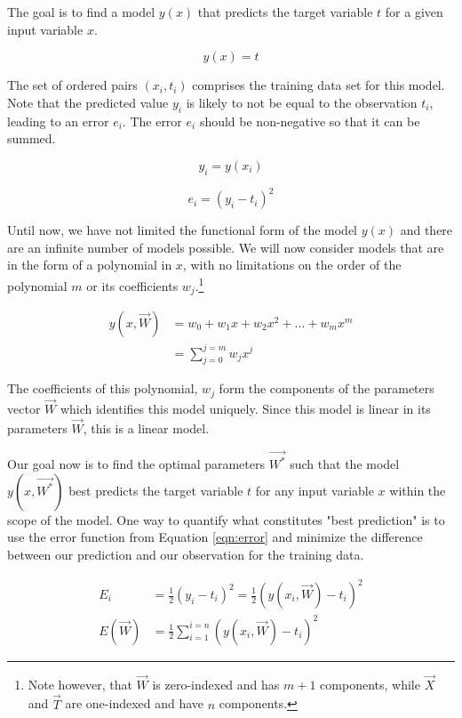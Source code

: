 \documentclass{article}
\begin{document}
The goal is to find a model \(y(x)\) that predicts the target variable \(t\) for a given input variable \(x\).

\begin{equation}
    y(x) = t
\end{equation}

The set of ordered pairs \((x_i, t_i)\) comprises the training data set for this model.
Note that the predicted value \(y_i\) is likely to not be equal to the observation \(t_i\), leading to an error \(e_i\).
The error \(e_i\) should be non-negative so that it can be summed.

\begin{equation}
    y_i = y(x_i)
\end{equation}

\begin{equation}
    e_i = (y_i - t_i)^2
    \label{eqn:error}
\end{equation}

Until now, we have not limited the functional form of the model \(y(x)\) and there are an infinite number of models possible.
We will now consider models that are in the form of a polynomial in \(x\), with no limitations on the order of the polynomial \(m\) or its coefficients \(w_j\).\footnote{Note however, that \(\vec{W}\) is zero-indexed and has \(m+1\) components, while \(\vec{X}\) and \(\vec{T}\) are one-indexed and have \(n\) components.}

\begin{align}
    y(x, \vec{W}) & = w_0 + w_1x + w_2x^2 + ... + w_mx^m \\
                  & = \sum_{j=0}^{j=m}{w_jx^j}
\end{align}

The coefficients of this polynomial, \(w_j\) form the components of the parameters vector \(\vec{W}\) which identifies this model uniquely.
Since this model is linear in its parameters \(\vec{W}\), this is a linear model.

Our goal now is to find the optimal parameters \(\vec{W^*}\) such that the model \(y(x, \vec{W^*})\) best predicts the target variable \(t\) for any input variable \(x\) within the scope of the model.
One way to quantify what constitutes "best prediction" is to use the error function from Equation \ref{eqn:error} and minimize the difference between our prediction and our observation for the training data.

\begin{align}
    E_i        & = \frac{1}{2}(y_i - t_i)^2 = \frac{1}{2}(y(x_i, \vec{W}) - t_i)^2 \\
    E(\vec{W}) & = \frac{1}{2}\sum_{i=1}^{i=n}(y(x_i, \vec{W}) - t_i)^2
\end{align}
\end{document}
